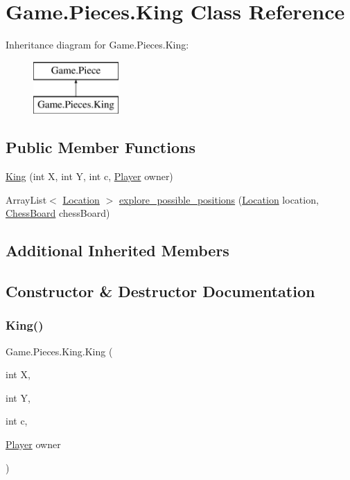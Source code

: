 \hypertarget{class_game_1_1_pieces_1_1_king}{}\section{Game.\+Pieces.\+King Class Reference}
\label{class_game_1_1_pieces_1_1_king}
Inheritance diagram for Game.\+Pieces.\+King\+:\begin{figure}[H]
\begin{center}
\leavevmode
\includegraphics[height=2.000000cm]{class_game_1_1_pieces_1_1_king}
\end{center}
\end{figure}
\subsection*{Public Member Functions}
\begin{DoxyCompactItemize}
\item 
\hyperlink{class_game_1_1_pieces_1_1_king_abc8de10a53ab294f572e3554ba4e42bd}{King} (int X, int Y, int c, \hyperlink{class_game_1_1_player}{Player} owner)
\item 
Array\+List$<$ \hyperlink{class_game_1_1_location}{Location} $>$ \hyperlink{class_game_1_1_pieces_1_1_king_a15c52d6f4866a6a46f4b72b30b00636e}{explore\+\_\+possible\+\_\+positions} (\hyperlink{class_game_1_1_location}{Location} location, \hyperlink{class_game_1_1_chess_board}{Chess\+Board} chess\+Board)
\end{DoxyCompactItemize}
\subsection*{Additional Inherited Members}


\subsection{Constructor \& Destructor Documentation}
\mbox{\label{class_game_1_1_pieces_1_1_king_abc8de10a53ab294f572e3554ba4e42bd}} 
\subsubsection{\texorpdfstring{King()}{King()}}
{\footnotesize\ttfamily Game.\+Pieces.\+King.\+King (\begin{DoxyParamCaption}\item[{int}]{X,  }\item[{int}]{Y,  }\item[{int}]{c,  }\item[{\hyperlink{class_game_1_1_player}{Player}}]{owner }\end{DoxyParamCaption})\hspace{0.3cm}{\ttfamily [inline]}}

